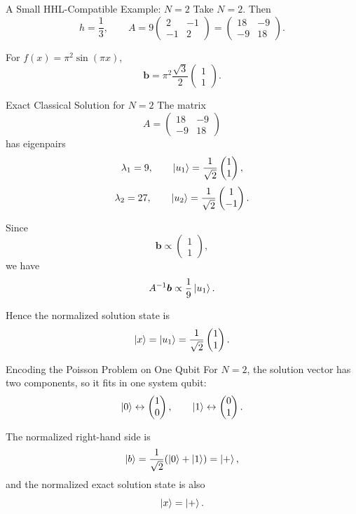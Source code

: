 \documentclass{beamer}
\begin{document}
\begin{frame}{A Small HHL-Compatible Example: \(N=2\)}
Take \(N=2\). Then
\[
h=\frac{1}{3},
\qquad
A = 9
\begin{pmatrix}
2 & -1\\
-1 & 2
\end{pmatrix}
=
\begin{pmatrix}
18 & -9\\
-9 & 18
\end{pmatrix}.
\]

For \(f(x)=\pi^2\sin(\pi x)\),
\[
\bm{b}
=
\pi^2 \frac{\sqrt{3}}{2}
\begin{pmatrix}
1\\
1
\end{pmatrix}.
\]
\end{frame}

\begin{frame}{Exact Classical Solution for \(N=2\)}
The matrix
\[
A=
\begin{pmatrix}
18 & -9\\
-9 & 18
\end{pmatrix}
\]
has eigenpairs
\[
\lambda_1=9,
\qquad
\ket{u_1}=\frac{1}{\sqrt{2}}
\begin{pmatrix}
1\\
1
\end{pmatrix},
\]
\[
\lambda_2=27,
\qquad
\ket{u_2}=\frac{1}{\sqrt{2}}
\begin{pmatrix}
1\\
-1
\end{pmatrix}.
\]

Since
\[
\bm{b}\propto
\begin{pmatrix}
1\\1
\end{pmatrix},
\]
we have
\[
A^{-1}\bm{b}\propto \frac{1}{9}\ket{u_1}.
\]

Hence the normalized solution state is
\[
\ket{x}=\ket{u_1}
=
\frac{1}{\sqrt{2}}
\begin{pmatrix}
1\\1
\end{pmatrix}.
\]
\end{frame}

\begin{frame}{Encoding the Poisson Problem on One Qubit}
For \(N=2\), the solution vector has two components, so it fits in one system qubit:
\[
\ket{0}\leftrightarrow
\begin{pmatrix}
1\\0
\end{pmatrix},
\qquad
\ket{1}\leftrightarrow
\begin{pmatrix}
0\\1
\end{pmatrix}.
\]

The normalized right-hand side is
\[
\ket{b} = \frac{1}{\sqrt{2}}(\ket{0}+\ket{1}) = \ket{+},
\]
and the normalized exact solution state is also
\[
\ket{x}=\ket{+}.
\]
\end{frame}
\end{document}
